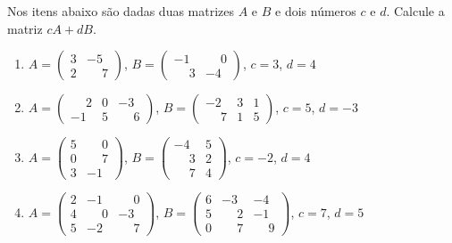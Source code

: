 \documentclass[12pt]{exam}
\begin{document}
    \questao{} Nos itens abaixo são dadas duas matrizes $A$ e $B$ e dois números $c$ e $d$. Calcule a matriz $cA + dB$.
    \begin{enumerate}[label={\alph*})]
        \item $A = \begin{pmatrix}3 & -5\\2 & \phantom{-} 7\end{pmatrix}$, $B = \begin{pmatrix}-1 & \phantom{-} 0\\\phantom{-} 3 & -4\end{pmatrix}$, $c = 3$, $d = 4$
        \item $A = \begin{pmatrix}\phantom{-} 2 & 0 & -3\\-1 & 5 & \phantom{-} 6\end{pmatrix}$, $B = \begin{pmatrix}-2 & 3 & 1\\\phantom{-} 7 & 1 & 5\end{pmatrix}$, $c = 5$, $d = -3$
        \item $A = \begin{pmatrix}5 & \phantom{-} 0\\0 & \phantom{-} 7\\3 & -1\end{pmatrix}$, $B = \begin{pmatrix}-4 & 5\\\phantom{-} 3 & 2\\\phantom{-} 7 & 4\end{pmatrix}$, $c = -2$, $d = 4$
        \item $A = \begin{pmatrix}2 & -1 & \phantom{-} 0\\4 & \phantom{-} 0 & -3\\5 & -2 & \phantom{-} 7\end{pmatrix}$, $B = \begin{pmatrix}6 & -3 & -4\\5 & \phantom{-} 2 & -1\\0 & \phantom{-} 7 & \phantom{-} 9\end{pmatrix}$, $c = 7$, $d = 5$
    \end{enumerate}

    \vspace{.3cm}
\end{document}
